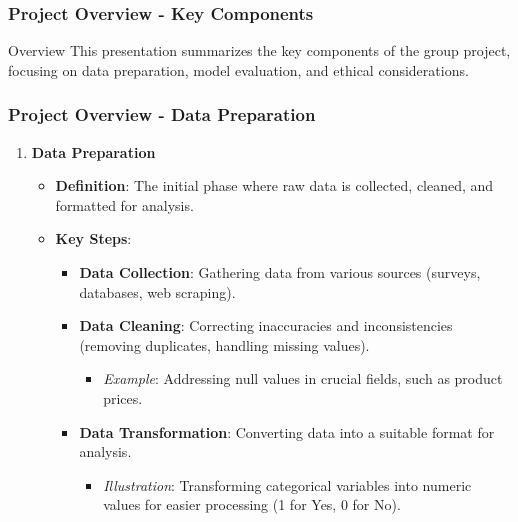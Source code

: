 \documentclass[aspectratio=169]{beamer}
\begin{document}
\begin{frame}[fragile]
    \frametitle{Project Overview - Key Components}
    \begin{block}{Overview}
        This presentation summarizes the key components of the group project, focusing on data preparation, model evaluation, and ethical considerations.
    \end{block}
\end{frame}

\begin{frame}[fragile]
    \frametitle{Project Overview - Data Preparation}
    \begin{enumerate}
        \item \textbf{Data Preparation}
        \begin{itemize}
            \item \textbf{Definition}: The initial phase where raw data is collected, cleaned, and formatted for analysis.
            \item \textbf{Key Steps}:
                \begin{itemize}
                    \item \textbf{Data Collection}: Gathering data from various sources (surveys, databases, web scraping).
                    \item \textbf{Data Cleaning}: Correcting inaccuracies and inconsistencies (removing duplicates, handling missing values).
                    \begin{itemize}
                        \item \textit{Example}: Addressing null values in crucial fields, such as product prices.
                    \end{itemize}
                    \item \textbf{Data Transformation}: Converting data into a suitable format for analysis.
                    \begin{itemize}
                        \item \textit{Illustration}: Transforming categorical variables into numeric values for easier processing (1 for Yes, 0 for No).
                    \end{itemize}
                \end{itemize}
        \end{itemize}
    \end{enumerate}
\end{frame}
\end{document}
